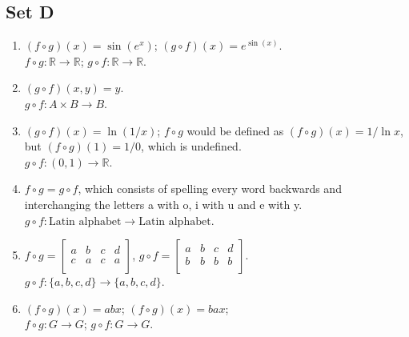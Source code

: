 \subsection{Set D}
\begin{enumerate}
    \item $(f \circ g)(x) = \sin(e^x)$; $(g \circ f)(x) = e^{\sin(x)}$.\\
    $f \circ g: \mathbb{R} \to \mathbb{R}$; $g \circ f: \mathbb{R} \to \mathbb{R}$.

    \item $(g \circ f)(x, y) = y$.\\
    $g \circ f: A \times B \to B$.

    \item $(g \circ f)(x) = \ln(1/x)$; $f \circ g$ would be defined as $(f \circ g)(x) = 1/\ln x$, but $(f \circ g)(1) = 1/0$, which is undefined.\\
    $g \circ f: (0, 1) \to \mathbb{R}$.

    \item $f \circ g = g \circ f$, which consists of spelling every word backwards and interchanging the letters a with o, i with u and e with y.\\
    $g \circ f: \text{Latin alphabet} \to \text{Latin alphabet}$.

    \item $f \circ g = \begin{bmatrix}
        a & b & c & d \\
        c & a & c & a \\
    \end{bmatrix}$, 
    $g \circ f = \begin{bmatrix}
        a & b & c & d \\
        b & b & b & b \\
    \end{bmatrix}$.\\
    $g \circ f: \{a, b, c, d\} \to \{a, b, c, d\}$.

    \item $(f \circ g)(x) = abx$; $(f \circ g)(x) = bax$;\\
    $f \circ g: G \to G$; $g \circ f: G \to G$.
\end{enumerate}

